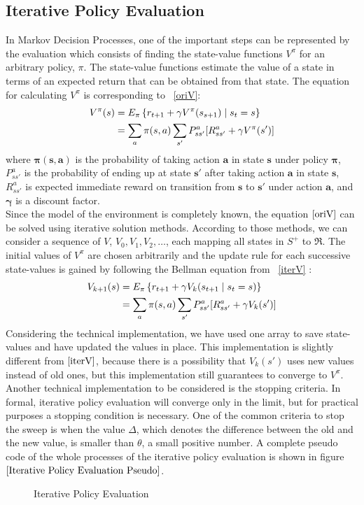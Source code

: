 \documentclass[paper=a4, fontsize=11pt]{scrartcl}
\numberwithin{equation}{section}		%
\numberwithin{figure}{section}			%
\numberwithin{table}{section}				%
\begin{document}
\subsection{Iterative Policy Evaluation}
\label{PEval}
In Markov Decision Processes, one of the important steps can be represented by the evaluation which consists of finding the state-value functions $V^\pi$ for an arbitrary policy, $\pi$. The state-value functions estimate the value of a state in terms of an expected return that can be obtained from that state. The equation for calculating $V^\pi$ is corresponding to ~\ref{oriV}:
\begin{align}
V^\pi(s)&=E_\pi\left\lbrace r_{t+1}+\gamma V^\pi(s_{s+1})\mid s_t=s \right\rbrace\notag\\
&=\sum_{a}\pi(s,a)\sum_{s'}P_{ss'}^a[R_{ss'}^a+\gamma V^\pi(s')] \label{oriV}
\end{align}
where $\mathbf{\pi(s,a)}$ is the probability of taking action $\mathbf{a}$ in state $\mathbf{s}$ under policy $\mathbf{\pi}$, $P_{ss'}^a$ is the probability of ending up at state $\mathbf{s'}$ after taking action $\mathbf{a}$ in state $\mathbf{s}$, $R_{ss'}^a$ is expected immediate reward on transition from $\mathbf{s}$ to $\mathbf{s'}$ under action $\mathbf{a}$, and $\mathbf{\gamma}$ is a discount factor.\\

Since the model of the environment is completely known, the equation $\eqref{oriV}$ can be solved using iterative solution methods. According to those methods, we can consider a sequence of $V$, $V_0, V_1, V_2, \dots$, each mapping all states in $S^+$ to $\Re$. The initial values of $V^\pi$ are chosen arbitrarily and the update rule for each successive state-values is gained by following the Bellman equation from ~\ref{iterV} :
\begin{align}
V_{k+1}(s) &= E_\pi\left\lbrace r_{t+1}+\gamma V_{k}(s_{t+1}\mid s_t=s) \right\rbrace\notag\\
&=\sum_{a}\pi(s,a)\sum_{s'}P_{ss'}^a [R_{ss'}^a+\gamma V_k(s')] \label{iterV}
\end{align}
Considering the technical implementation, we have used one array to save state-values and have updated the values in place. This implementation is slightly different from $\eqref{iterV}$, because there is a possibility that $V_k(s')$ uses new values  instead of old ones, but this implementation still guarantees to converge to $V^\pi$. Another technical implementation to be considered is the stopping criteria. In formal, iterative policy evaluation will converge only in the limit, but for practical purposes a stopping condition is necessary. One of the common criteria to stop the sweep is when the value $\Delta$, which denotes the difference between the old and the new value, is smaller than $\theta$, a small positive number. A complete pseudo code of the whole processes of the iterative policy evaluation is shown in figure $\ref{Iterative Policy Evaluation Pseudo}$.
\begin{figure}[H] \centering
{}
\caption{Iterative Policy Evaluation ~\cite{suttonBarto}} \label{Iterative Policy Evaluation Pseudo}
\end{figure}
\end{document}
